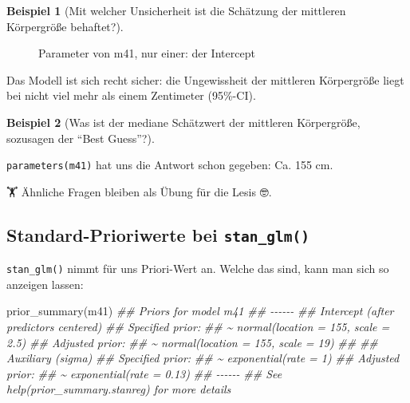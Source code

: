 \documentclass[
  a4paper,
  DIV=11]{scrreprt}
\newenvironment{Shaded}{\begin{snugshade}}{\end{snugshade}}
\newcommand{\DocumentationTok}[1]{\textcolor[rgb]{0.37,0.37,0.37}{\textit{#1}}}
\newcommand{\FunctionTok}[1]{\textcolor[rgb]{0.28,0.35,0.67}{#1}}
\newcommand{\NormalTok}[1]{\textcolor[rgb]{0.00,0.23,0.31}{#1}}
\theoremstyle{definition}
\newtheorem{example}{Beispiel}[chapter]
\theoremstyle{remark}
\begin{document}
\begin{example}[Mit welcher Unsicherheit ist die Schätzung der mittleren
Körpergröße behaftet?]
\begin{figure}[H]
{}

\caption{\label{fig-m41-params-intercept}Parameter von m41, nur einer:
der Intercept}

\end{figure}

Das Modell ist sich recht sicher: die Ungewissheit der mittleren
Körpergröße liegt bei nicht viel mehr als einem Zentimeter (95\%-CI).

\end{example}

\leavevmode{}%
\begin{example}[Was ist der mediane Schätzwert der mittleren
Körpergröße, sozusagen der ``Best Guess''?]\label{exm-kung6}

\texttt{parameters(m41)} hat uns die Antwort schon gegeben: Ca. 155 cm.

\end{example}

🏋️ Ähnliche Fragen bleiben als Übung für die Lesis 🤓.

\hypertarget{standard-prioriwerte-bei-stan_glm}{%
\subsection{\texorpdfstring{Standard-Prioriwerte bei
\texttt{stan\_glm()}}{Standard-Prioriwerte bei stan\_glm()}}\label{standard-prioriwerte-bei-stan_glm}}

\texttt{stan\_glm()} nimmt für uns Priori-Wert an. Welche das sind, kann
man sich so anzeigen lassen:

\begin{Shaded}
\begin{Highlighting}[]
\FunctionTok{prior\_summary}\NormalTok{(m41)}
\DocumentationTok{\#\# Priors for model \textquotesingle{}m41\textquotesingle{} }
\DocumentationTok{\#\# {-}{-}{-}{-}{-}{-}}
\DocumentationTok{\#\# Intercept (after predictors centered)}
\DocumentationTok{\#\#   Specified prior:}
\DocumentationTok{\#\#     \textasciitilde{} normal(location = 155, scale = 2.5)}
\DocumentationTok{\#\#   Adjusted prior:}
\DocumentationTok{\#\#     \textasciitilde{} normal(location = 155, scale = 19)}
\DocumentationTok{\#\# }
\DocumentationTok{\#\# Auxiliary (sigma)}
\DocumentationTok{\#\#   Specified prior:}
\DocumentationTok{\#\#     \textasciitilde{} exponential(rate = 1)}
\DocumentationTok{\#\#   Adjusted prior:}
\DocumentationTok{\#\#     \textasciitilde{} exponential(rate = 0.13)}
\DocumentationTok{\#\# {-}{-}{-}{-}{-}{-}}
\DocumentationTok{\#\# See help(\textquotesingle{}prior\_summary.stanreg\textquotesingle{}) for more details}
\end{Highlighting}
\end{Shaded}
\end{document}
